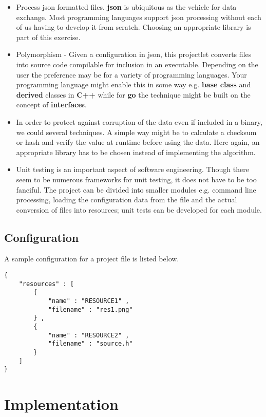 \documentclass[12pt, a4paper]{article} %
\begin{document}
\begin{itemize}
    \item Process json formatted files. \textbf{json} is ubiquitous as the vehicle for data exchange. Most programming languages support json processing without each of us having to develop it from scratch. Choosing an appropriate library is part of this exercise.
    \item Polymorphism - Given a configuration in json, this projectlet converts files into source code compilable for inclusion in an executable. Depending on the user the preference may be for a variety of programming languages. Your programming language might enable this in some way e.g. \textbf{base class} and \textbf{derived} classes in \textbf{C++} while for \textbf{go} the technique might be built on the concept of \textbf{interface}s.
    \item In order to protect against corruption of the data even if included in a binary, we could several techniques. A simple way might be to calculate a checksum or hash and verify the value at runtime before using the data. Here again, an appropriate library has to be chosen instead of implementing the algorithm.
    \item Unit testing is an important aspect of software engineering. Though there seem to be numerous frameworks for unit testing, it does not have to be too fanciful. The project can be divided into smaller modules e.g. command line processing, loading the configuration data from the file and the actual conversion of files into resources; unit tests can be developed for each module.
\end{itemize}

\subsection{Configuration}

A sample configuration for a project file is listed below.

\begin{lstlisting}[caption=Example config.json]
{
    "resources" : [
        {
            "name" : "RESOURCE1" ,
            "filename" : "res1.png"
        } ,
        {
            "name" : "RESOURCE2" ,
            "filename" : "source.h"
        }
    ]
}

\end{lstlisting}

\section{Implementation}
\end{document}
